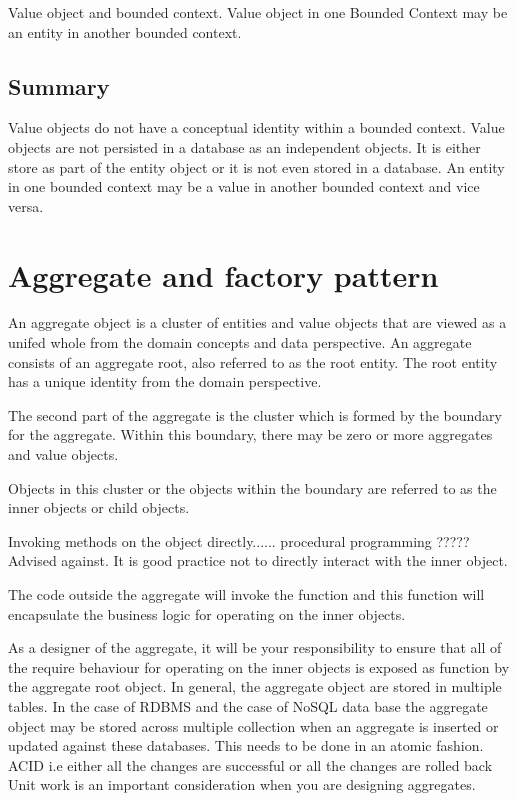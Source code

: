 Value object and bounded context.
Value object in one Bounded Context may be an entity in another bounded context.

\subsection{Summary}
Value objects do not have a conceptual identity within a bounded context.
Value objects are not persisted in a database as an independent objects.
It is either store as part of the entity object or it is not even stored in a database.
An entity in one bounded context may be a value in another bounded context and vice versa.


\section{Aggregate and factory pattern}
An aggregate object is a cluster of entities and value objects that are viewed as a unifed whole from the domain concepts and data perspective.
An aggregate consists of an aggregate root, also referred to as the root entity.
The root entity has a unique identity from the domain perspective.

The second part of the aggregate is the cluster which is formed by the boundary for the aggregate.
Within this boundary, there may be zero or more aggregates and value objects.

Objects in this cluster or the objects within the boundary are referred to as the inner objects or child objects.

Invoking methods on the object directly...... procedural programming ????? Advised against.
It is good practice not to directly interact with the inner object.

The code outside the aggregate will invoke the function and this function will encapsulate the business logic for operating on the inner objects.

As a designer of the aggregate, it will be your responsibility to ensure that all of the require behaviour for operating on the inner objects is exposed as function by the aggregate root object.
In general, the aggregate object are stored in multiple tables.
In the case of RDBMS and the case of NoSQL data base the aggregate object may be stored across multiple collection when an aggregate is inserted or updated against these databases.
This needs to be done in an atomic fashion.
ACID i.e either all the changes are successful or all the changes are rolled back %
Unit work is an important consideration when you are designing aggregates.

